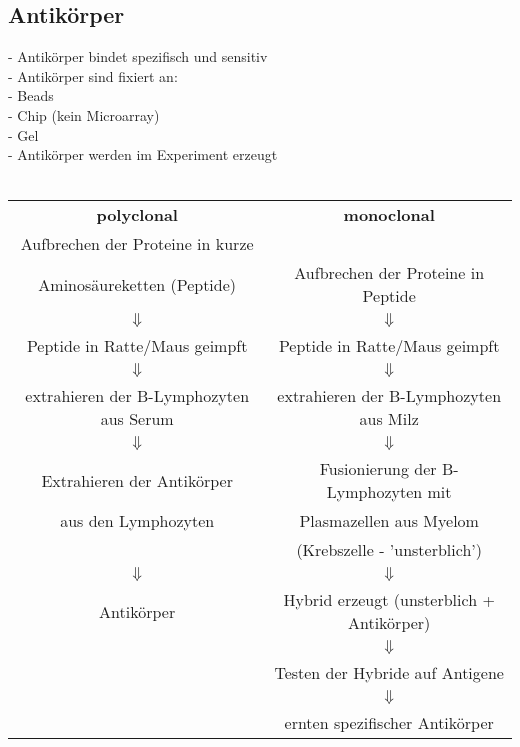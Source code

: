 \subsection{Antikörper}
- Antikörper bindet spezifisch und sensitiv \\
- Antikörper sind fixiert an:\\
\hspace*{15mm} - Beads\\
\hspace*{15mm} - Chip (kein Microarray)\\
\hspace*{15mm} - Gel\\
- Antikörper werden im Experiment erzeugt\\
\\
\begin{tabular}{cc}
  \textbf{polyclonal} & \textbf{monoclonal}\\
  Aufbrechen der Proteine in kurze\\ 
  Aminosäureketten (Peptide) & Aufbrechen der Proteine in Peptide\\
  $\Downarrow$ & $\Downarrow$\\
  Peptide in Ratte/Maus geimpft & Peptide in Ratte/Maus geimpft\\
  $\Downarrow$ & $\Downarrow$\\
  extrahieren der B-Lymphozyten aus Serum & extrahieren der B-Lymphozyten aus Milz\\
  $\Downarrow$ & $\Downarrow$\\
  Extrahieren der Antikörper &Fusionierung der B-Lymphozyten mit\\ 
   aus den Lymphozyten & Plasmazellen aus Myelom\\
   & (Krebszelle - 'unsterblich')\\
  $\Downarrow$ & $\Downarrow$\\
  Antikörper & Hybrid erzeugt (unsterblich + Antikörper)\\
  & $\Downarrow$\\
  & Testen der Hybride auf Antigene\\
  & $\Downarrow$\\
  & ernten spezifischer Antikörper
\end{tabular}